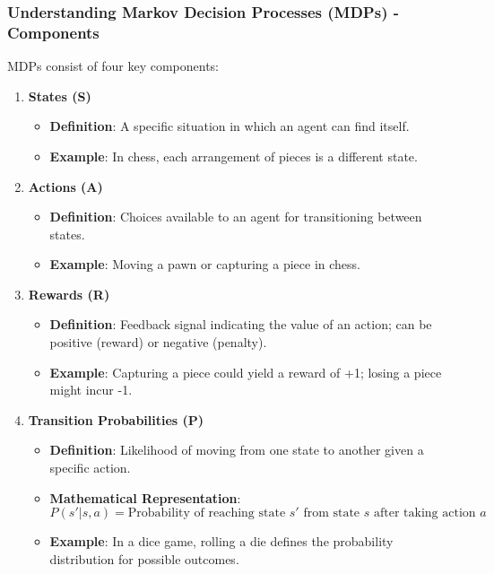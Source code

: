 \documentclass[aspectratio=169]{beamer}
\begin{document}
\begin{frame}[fragile]
    \frametitle{Understanding Markov Decision Processes (MDPs) - Components}
    MDPs consist of four key components:
    \begin{enumerate}
        \item \textbf{States (S)}
            \begin{itemize}
                \item \textbf{Definition}: A specific situation in which an agent can find itself.
                \item \textbf{Example}: In chess, each arrangement of pieces is a different state.
            \end{itemize}
        \item \textbf{Actions (A)}
            \begin{itemize}
                \item \textbf{Definition}: Choices available to an agent for transitioning between states.
                \item \textbf{Example}: Moving a pawn or capturing a piece in chess.
            \end{itemize}
        \item \textbf{Rewards (R)}
            \begin{itemize}
                \item \textbf{Definition}: Feedback signal indicating the value of an action; can be positive (reward) or negative (penalty).
                \item \textbf{Example}: Capturing a piece could yield a reward of +1; losing a piece might incur -1.
            \end{itemize}
        \item \textbf{Transition Probabilities (P)}
            \begin{itemize}
                \item \textbf{Definition}: Likelihood of moving from one state to another given a specific action.
                \item \textbf{Mathematical Representation}:
                \[
                P(s' | s, a) = \text{Probability of reaching state } s' \text{ from state } s \text{ after taking action } a
                \]
                \item \textbf{Example}: In a dice game, rolling a die defines the probability distribution for possible outcomes.
            \end{itemize}
    \end{enumerate}
\end{frame}
\end{document}
